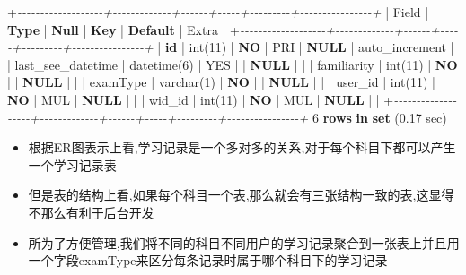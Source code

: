 \documentclass[
]{article}
\newenvironment{Shaded}{}{}
\newcommand{\CommentTok}[1]{\textcolor[rgb]{0.38,0.63,0.69}{\textit{#1}}}
\newcommand{\DataTypeTok}[1]{\textcolor[rgb]{0.56,0.13,0.00}{#1}}
\newcommand{\DecValTok}[1]{\textcolor[rgb]{0.25,0.63,0.44}{#1}}
\newcommand{\FloatTok}[1]{\textcolor[rgb]{0.25,0.63,0.44}{#1}}
\newcommand{\KeywordTok}[1]{\textcolor[rgb]{0.00,0.44,0.13}{\textbf{#1}}}
\newcommand{\NormalTok}[1]{#1}
\newcommand{\OperatorTok}[1]{\textcolor[rgb]{0.40,0.40,0.40}{#1}}
\begin{document}
\begin{Shaded}
\begin{Highlighting}[]
\OperatorTok{+}\CommentTok{{-}{-}{-}{-}{-}{-}{-}{-}{-}{-}{-}{-}{-}{-}{-}{-}{-}{-}{-}+{-}{-}{-}{-}{-}{-}{-}{-}{-}{-}{-}{-}{-}+{-}{-}{-}{-}{-}{-}+{-}{-}{-}{-}{-}+{-}{-}{-}{-}{-}{-}{-}{-}{-}+{-}{-}{-}{-}{-}{-}{-}{-}{-}{-}{-}{-}{-}{-}{-}{-}+}
\NormalTok{| Field             | }\KeywordTok{Type}\NormalTok{        | }\KeywordTok{Null}\NormalTok{ | }\KeywordTok{Key}\NormalTok{ | }\KeywordTok{Default}\NormalTok{ | Extra          |}
\OperatorTok{+}\CommentTok{{-}{-}{-}{-}{-}{-}{-}{-}{-}{-}{-}{-}{-}{-}{-}{-}{-}{-}{-}+{-}{-}{-}{-}{-}{-}{-}{-}{-}{-}{-}{-}{-}+{-}{-}{-}{-}{-}{-}+{-}{-}{-}{-}{-}+{-}{-}{-}{-}{-}{-}{-}{-}{-}+{-}{-}{-}{-}{-}{-}{-}{-}{-}{-}{-}{-}{-}{-}{-}{-}+}
\NormalTok{| }\KeywordTok{id}\NormalTok{                | }\DataTypeTok{int}\NormalTok{(}\DecValTok{11}\NormalTok{)     | }\KeywordTok{NO}\NormalTok{   | PRI | }\KeywordTok{NULL}\NormalTok{    | auto\_increment |}
\NormalTok{| last\_see\_datetime | datetime(}\DecValTok{6}\NormalTok{) | YES  |     | }\KeywordTok{NULL}\NormalTok{    |                |}
\NormalTok{| familiarity       | }\DataTypeTok{int}\NormalTok{(}\DecValTok{11}\NormalTok{)     | }\KeywordTok{NO}\NormalTok{   |     | }\KeywordTok{NULL}\NormalTok{    |                |}
\NormalTok{| examType          | }\DataTypeTok{varchar}\NormalTok{(}\DecValTok{1}\NormalTok{)  | }\KeywordTok{NO}\NormalTok{   |     | }\KeywordTok{NULL}\NormalTok{    |                |}
\NormalTok{| user\_id           | }\DataTypeTok{int}\NormalTok{(}\DecValTok{11}\NormalTok{)     | }\KeywordTok{NO}\NormalTok{   | MUL | }\KeywordTok{NULL}\NormalTok{    |                |}
\NormalTok{| wid\_id            | }\DataTypeTok{int}\NormalTok{(}\DecValTok{11}\NormalTok{)     | }\KeywordTok{NO}\NormalTok{   | MUL | }\KeywordTok{NULL}\NormalTok{    |                |}
\OperatorTok{+}\CommentTok{{-}{-}{-}{-}{-}{-}{-}{-}{-}{-}{-}{-}{-}{-}{-}{-}{-}{-}{-}+{-}{-}{-}{-}{-}{-}{-}{-}{-}{-}{-}{-}{-}+{-}{-}{-}{-}{-}{-}+{-}{-}{-}{-}{-}+{-}{-}{-}{-}{-}{-}{-}{-}{-}+{-}{-}{-}{-}{-}{-}{-}{-}{-}{-}{-}{-}{-}{-}{-}{-}+}
\DecValTok{6} \KeywordTok{rows} \KeywordTok{in} \KeywordTok{set}\NormalTok{ (}\FloatTok{0.17}\NormalTok{ sec)}
\end{Highlighting}
\end{Shaded}

\begin{itemize}
\item
  根据ER图表示上看,学习记录是一个多对多的关系,对于每个科目下都可以产生一个学习记录表
\item
  但是表的结构上看,如果每个科目一个表,那么就会有三张结构一致的表,这显得不那么有利于后台开发
\item
  所为了方便管理,我们将不同的科目不同用户的学习记录聚合到一张表上并且用一个字段examType来区分每条记录时属于哪个科目下的学习记录
\end{itemize}
\end{document}
